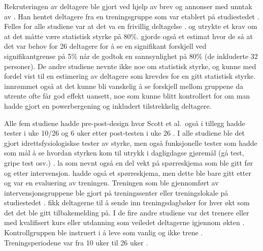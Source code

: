 \documentclass[
]{book}
\begin{document}
Rekruteringen av deltagere ble gjort ved hjelp av brev og annonser med unntak av \citeauthor{schott2019} \citetext{\citeyear{schott2019}; \citealp{geirsdottir2012}; \citealp{turpela2017}; \citealp{vikberg2019}; \citealp{vincent2002}}. Han hentet deltagere fra en treningsgruppe som var etablert på studiestedet \citep{schott2019}. Felles for alle studiene var at det va en frivillig deltagelse \citep{geirsdottir2012, schott2019, turpela2017, vikberg2019, vincent2002}. \citet{schott2019} og \citet{vincent2002} utrykte et krav om at det måtte være statistisk styrke på 80\%. \citet{schott2019} gjorde også et estimat hvor de så at det var behov for 26 deltagere for å se en signifikant forskjell ved signifikantgrense på 5\% når de godtok en sannsynlighet på 80\% (de inkluderte 32 personer). De andre studiene nevnte ikke noe om statistisk styrke, og kunne med fordel vist til en estimering av deltagere som krevdes for en gitt statistisk styrke. \citet{turpela2017} innrømmet også at det kunne bli vanskelig å se forskjell mellom gruppene da utrente ofte får god effekt uansett, noe som kunne blitt kontrollert for om man hadde gjort en powerbergening og inkludert tilstrekkelig deltagere.

Alle fem studiene hadde pre-post-design hvor Scott et al.~også i tillegg hadde tester i uke 10/26 og 6 uker etter post-testen i uke 26 \citep{geirsdottir2012, schott2019, turpela2017, vikberg2019, vincent2002}. I alle studiene ble det gjort idrettsfysiologiskse tester av styrke, men også funksjonelle tester som hadde som mål å se hvordan styrken kom til utrykk i dagligdagse gjøremål (gå test, gripe test osv.) \citep{geirsdottir2012, schott2019, turpela2017, vikberg2019, vincent2002}. \citet{geirsdottir2012} la som nevnt også en del vekt på spørreskjema som ble gitt før og etter intervensjon. \citet{schott2019} hadde også et spørreskjema, men dette ble bare gitt etter og var en evaluering av treningen. Treningen som ble gjennomført av intervensjonsgruppene ble gjort på treningssenter eller treningslokale på studiestedet \citep{geirsdottir2012, schott2019, turpela2017, vikberg2019, vincent2002}. \citet{vincent2002} fikk deltagerne til å sende inn treningsdagbøker for hver økt som det det ble gitt tilbakemelding på. I de fire andre studiene var det trenere eller med kvalifisert kurs eller utdanning som veiledet deltagerne igjennom økten \citep{geirsdottir2012, schott2019, turpela2017, vikberg2019}. Kontrollgruppen ble instruert i å leve som vanlig og ikke trene \citep{schott2019, turpela2017, vikberg2019, vincent2002}. Treningsperiodene var fra 10 uker til 26 uker \citetext{\citealp{geirsdottir2012}; \citealp{schott2019}; \citealp[\href{mailto:2019;@Turpela}{}][]{turpela2017}; \citealp{vikberg2019}; \citealp{vincent2002}}.
\end{document}
